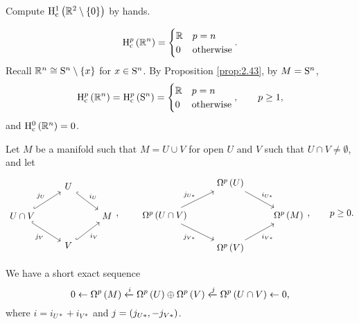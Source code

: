 \begin{exercise*}
Compute $ \H_\c^1\br{\RR^2 \setminus \cbr{0}} $ by hands.
\end{exercise*}

\begin{example}
$$ \H_\c^p\br{\RR^n} =
\begin{cases}
\RR & p = n \\
0 & \text{otherwise}
\end{cases}.
$$
Recall $ \RR^n \cong \S^n \setminus \cbr{x} $ for $ x \in \S^n $. By Proposition \ref{prop:2.43}, by $ M = \S^n $,
$$ \H_\c^p\br{\RR^n} = \H_\c^p\br{\S^n} =
\begin{cases}
\RR & p = n \\
0 & \text{otherwise}
\end{cases},
\qquad p \ge 1, $$
and $ \H_\c^0\br{\RR^n} = 0 $.
\end{example}

\pagebreak


Let $ M $ be a manifold such that $ M = U \cup V $ for open $ U $ and $ V $ such that $ U \cap V \ne \emptyset $, and let
$$
\begin{tikzcd}
& U \arrow[hookrightarrow]{dr}{i_U} & \\
U \cap V \arrow[hookrightarrow]{ur}{j_U} \arrow[hookrightarrow, swap]{dr}{j_V} & & M \\
& V \arrow[hookrightarrow, swap]{ur}{i_V} &
\end{tikzcd},
\qquad
\begin{tikzcd}
& \Omega^p\br{U} \arrow{dr}{i_{U*}} & \\
\Omega^p\br{U \cap V} \arrow{ur}{j_{U*}} \arrow[swap]{dr}{j_{V*}} & & \Omega^p\br{M} \\
& \Omega^p\br{V} \arrow[swap]{ur}{i_{V*}} &
\end{tikzcd},
\qquad p \ge 0. $$

\begin{proposition}
We have a short exact sequence
$$ 0 \leftarrow \Omega^p\br{M} \xleftarrow{i} \Omega^p\br{U} \oplus \Omega^p\br{V} \xleftarrow{j} \Omega^p\br{U \cap V} \leftarrow 0, $$
where $ i = i_{U*} + i_{V*} $ and $ j = \br{j_{U*}, -j_{V*}} $.
\end{proposition}

